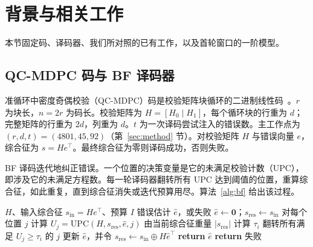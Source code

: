 \section{背景与相关工作}\label{sec:background}

本节固定码、译码器、我们所对照的已有工作，以及首轮窗口的一阶模型。

\subsection{QC-MDPC 码与 BF 译码器}

准循环中密度奇偶校验（QC-MDPC）码是校验矩阵块循环的二进制线性码~\cite{misoczki2013mdpc}。$r$ 为块长，$n=2r$ 为码长。校验矩阵为 $H=[H_0\mid H_1]$，每个循环块的行重为 $d$；完整矩阵的行重为 $2d$，列重为 $d$。$t$ 为一次译码尝试注入的错误数。主工作点为 $(r,d,t)=(4801,45,92)$（第~\ref{sec:method} 节）。对校验矩阵 $H$ 与错误向量 $e$，综合征为 $s=He^{\top}$。最终综合征为零则译码成功，否则失败。

BF 译码迭代地纠正错误。一个位置的决策变量是它的未满足校验计数（UPC），即涉及它的未满足方程数。每一轮译码器翻转所有 UPC 达到阈值的位置，重算综合征，如此重复，直到综合征消失或迭代预算用尽。算法~\ref{alg:bf} 给出该过程。

\begin{algorithm}[t]
\caption{普通 BF 译码}
\label{alg:bf}
\begin{algorithmic}[1]
\Require $H$、输入综合征 $s_{\mathrm{in}}=He^{\top}$、预算 $I$
\Ensure 错误估计 $\hat e$，或失败
\State $\hat e \gets \mathbf{0}$；$s_{\mathrm{res}} \gets s_{\mathrm{in}}$
  \State 对每个位置 $j$ 计算 $U_j=\mathrm{UPC}(H,s_{\mathrm{res}},\hat e,j)$
  \State 由当前综合征重量 $|s_{\mathrm{res}}|$ 计算 $\tau_i$
  \State 翻转所有满足 $U_j\ge\tau_i$ 的 $j$
  \State 更新 $\hat e$，并令 $s_{\mathrm{res}}\gets s_{\mathrm{in}}\oplus H\hat e^{\top}$
    \State \textbf{return} $\hat e$
  \EndIf
\EndFor
\State \textbf{return} 失败
\end{algorithmic}
\end{algorithm}

